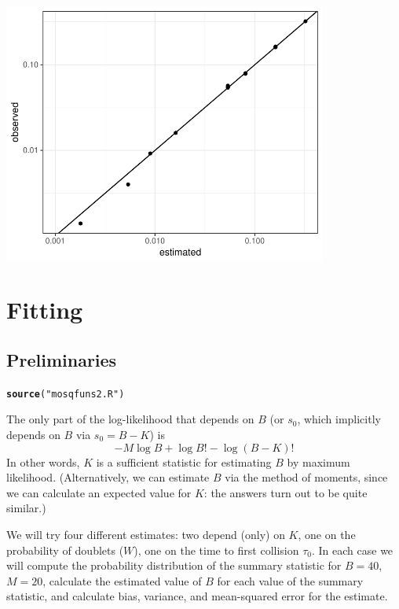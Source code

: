 \documentclass{article}\usepackage[]{graphicx}\usepackage[]{color}
\makeatletter
\newcommand{\hlstr}[1]{\textcolor[rgb]{0.192,0.494,0.8}{#1}}%
\newcommand{\hlstd}[1]{\textcolor[rgb]{0.345,0.345,0.345}{#1}}%
\newcommand{\hlkwd}[1]{\textcolor[rgb]{0.737,0.353,0.396}{\textbf{#1}}}%
\newenvironment{kframe}{%
 \def\at@end@of@kframe{}%
 \ifinner\ifhmode%
  \def\at@end@of@kframe{\end{minipage}}%
  \begin{minipage}{\columnwidth}%
 \fi\fi%
 \def\FrameCommand##1{\hskip\@totalleftmargin \hskip-\fboxsep
 \colorbox{shadecolor}{##1}\hskip-\fboxsep
     \hskip-\linewidth \hskip-\@totalleftmargin \hskip\columnwidth}%
 \MakeFramed {\advance\hsize-\width
   \@totalleftmargin\z@ \linewidth\hsize
   \@setminipage}}%
 {\par\unskip\endMakeFramed%
 \at@end@of@kframe}
\newenvironment{knitrout}{}{} %
\makeatother
\begin{document}
\begin{knitrout}
\color{fgcolor}
\includegraphics[width=0.8\textwidth]{figure/ex3plot-1} 

\end{knitrout}

\section{Fitting}

\subsection{Preliminaries}
\begin{knitrout}
\color{fgcolor}\begin{kframe}
\begin{alltt}
\hlkwd{source}\hlstd{(}\hlstr{"mosqfuns2.R"}\hlstd{)}
\end{alltt}
\end{kframe}
\end{knitrout}
The only part of the log-likelihood
that depends on $B$ (or $s_0$, which implicitly depends on $B$
via $s_0=B-K$) is
$$
-M \log B + \log B! - \log (B-K)!
$$
In other words, $K$ is a sufficient statistic for estimating $B$ 
by maximum likelihood.  (Alternatively, we can estimate $B$ via
the method of moments, since we can calculate an expected value for
$K$: the answers turn out to be quite similar.)

We will try four different estimates: two depend (only) on $K$,
one on the probability of doublets ($W$), one on the time to
first collision $\tau_0$.  In each case we will compute the
probability distribution of the summary statistic for
$B=40$, $M=20$, calculate the estimated value of $B$ for each
value of the summary statistic, and calculate bias, variance,
and mean-squared error for the estimate.
\end{document}
